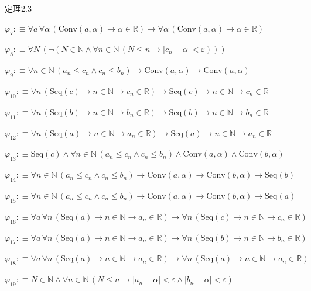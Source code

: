 \begin{fullproof}{定理2.3}
\begin{abbrevlist}
\item $\varphi_{7} :\equiv \forall a\,\forall \alpha\,(\mathrm{Conv}(a,\alpha) \to \alpha \in \mathbb{R}) \to \forall \alpha\,(\mathrm{Conv}(a,\alpha) \to \alpha \in \mathbb{R})$
\item $\varphi_{8} :\equiv \forall N\,(\neg (N \in \mathbb{N} \land \forall n \in \mathbb{N}\,(N \leq n \to \lvert c_{n} - \alpha \rvert < \varepsilon)))$
\item $\varphi_{9} :\equiv \forall n \in \mathbb{N}\,(a_{n} \leq c_{n} \land c_{n} \leq b_{n}) \to \mathrm{Conv}(a,\alpha) \to \mathrm{Conv}(a,\alpha)$
\item $\varphi_{10} :\equiv \forall n\,(\mathrm{Seq}(c) \to n \in \mathbb{N} \to c_{n} \in \mathbb{R}) \to \mathrm{Seq}(c) \to n \in \mathbb{N} \to c_{n} \in \mathbb{R}$
\item $\varphi_{11} :\equiv \forall n\,(\mathrm{Seq}(b) \to n \in \mathbb{N} \to b_{n} \in \mathbb{R}) \to \mathrm{Seq}(b) \to n \in \mathbb{N} \to b_{n} \in \mathbb{R}$
\item $\varphi_{12} :\equiv \forall n\,(\mathrm{Seq}(a) \to n \in \mathbb{N} \to a_{n} \in \mathbb{R}) \to \mathrm{Seq}(a) \to n \in \mathbb{N} \to a_{n} \in \mathbb{R}$
\item $\varphi_{13} :\equiv \mathrm{Seq}(c) \land \forall n \in \mathbb{N}\,(a_{n} \leq c_{n} \land c_{n} \leq b_{n}) \land \mathrm{Conv}(a,\alpha) \land \mathrm{Conv}(b,\alpha)$
\item $\varphi_{14} :\equiv \forall n \in \mathbb{N}\,(a_{n} \leq c_{n} \land c_{n} \leq b_{n}) \to \mathrm{Conv}(a,\alpha) \to \mathrm{Conv}(b,\alpha) \to \mathrm{Seq}(b)$
\item $\varphi_{15} :\equiv \forall n \in \mathbb{N}\,(a_{n} \leq c_{n} \land c_{n} \leq b_{n}) \to \mathrm{Conv}(a,\alpha) \to \mathrm{Conv}(b,\alpha) \to \mathrm{Seq}(a)$
\item $\varphi_{16} :\equiv \forall a\,\forall n\,(\mathrm{Seq}(a) \to n \in \mathbb{N} \to a_{n} \in \mathbb{R}) \to \forall n\,(\mathrm{Seq}(c) \to n \in \mathbb{N} \to c_{n} \in \mathbb{R})$
\item $\varphi_{17} :\equiv \forall a\,\forall n\,(\mathrm{Seq}(a) \to n \in \mathbb{N} \to a_{n} \in \mathbb{R}) \to \forall n\,(\mathrm{Seq}(b) \to n \in \mathbb{N} \to b_{n} \in \mathbb{R})$
\item $\varphi_{18} :\equiv \forall a\,\forall n\,(\mathrm{Seq}(a) \to n \in \mathbb{N} \to a_{n} \in \mathbb{R}) \to \forall n\,(\mathrm{Seq}(a) \to n \in \mathbb{N} \to a_{n} \in \mathbb{R})$
\item $\varphi_{19} :\equiv N \in \mathbb{N} \land \forall n \in \mathbb{N}\,(N \leq n \to \lvert a_{n} - \alpha \rvert < \varepsilon \land \lvert b_{n} - \alpha \rvert < \varepsilon)$

\end{abbrevlist}
\end{fullproof}
